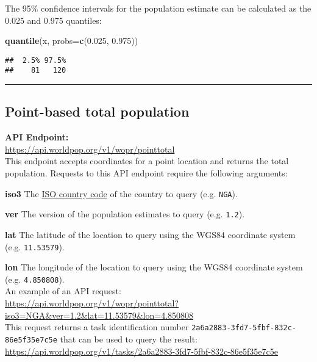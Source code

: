 \documentclass[]{article}
\newenvironment{Shaded}{\begin{snugshade}}{\end{snugshade}}
\newcommand{\KeywordTok}[1]{\textcolor[rgb]{0.13,0.29,0.53}{\textbf{#1}}}
\newcommand{\DataTypeTok}[1]{\textcolor[rgb]{0.13,0.29,0.53}{#1}}
\newcommand{\FloatTok}[1]{\textcolor[rgb]{0.00,0.00,0.81}{#1}}
\newcommand{\NormalTok}[1]{#1}
\begin{document}
The 95\% confidence intervals for the population estimate can be
calculated as the 0.025 and 0.975 quantiles:

\begin{Shaded}
\begin{Highlighting}[]
\KeywordTok{quantile}\NormalTok{(x, }\DataTypeTok{probs=}\KeywordTok{c}\NormalTok{(}\FloatTok{0.025}\NormalTok{, }\FloatTok{0.975}\NormalTok{))}
\end{Highlighting}
\end{Shaded}

\begin{verbatim}
##  2.5% 97.5% 
##    81   120
\end{verbatim}

\begin{center}\rule{0.5\linewidth}{0.5pt}\end{center}

\subsection{Point-based total
population}\label{point-based-total-population}

\textbf{API Endpoint:}\\
\url{https://api.worldpop.org/v1/wopr/pointtotal}\\

This endpoint accepts coordinates for a point location and returns the
total population. Requests to this API endpoint require the following
arguments:

\textbf{iso3} The
\href{https://en.wikipedia.org/wiki/ISO_3166-1_alpha-3}{ISO country
code} of the country to query (e.g. \texttt{NGA}).

\textbf{ver} The version of the population estimates to query (e.g.
\texttt{1.2}).

\textbf{lat} The latitude of the location to query using the WGS84
coordinate system (e.g. \texttt{11.53579}).

\textbf{lon} The longitude of the location to query using the WGS84
coordinate system (e.g. \texttt{4.850808}).\\

An example of an API request:\\
\url{https://api.worldpop.org/v1/wopr/pointtotal?iso3=NGA\&ver=1.2\&lat=11.53579\&lon=4.850808}\\

This request returns a task identification number
\texttt{2a6a2883-3fd7-5fbf-832c-86e5f35e7c5e} that can be used to query
the result:\\
\url{https://api.worldpop.org/v1/tasks/2a6a2883-3fd7-5fbf-832c-86e5f35e7c5e}\\
\end{document}
